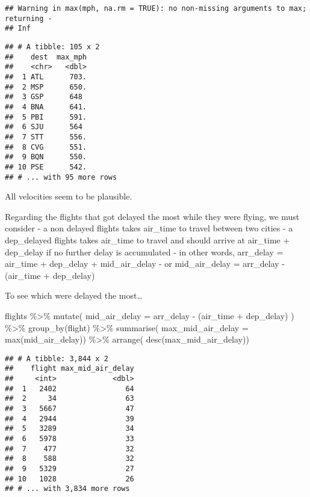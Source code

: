 \documentclass[
]{article}
\newenvironment{Shaded}{\begin{snugshade}}{\end{snugshade}}
\newcommand{\AttributeTok}[1]{\textcolor[rgb]{0.77,0.63,0.00}{#1}}
\newcommand{\FunctionTok}[1]{\textcolor[rgb]{0.00,0.00,0.00}{#1}}
\newcommand{\NormalTok}[1]{#1}
\newcommand{\SpecialCharTok}[1]{\textcolor[rgb]{0.00,0.00,0.00}{#1}}
\begin{document}
\begin{verbatim}
## Warning in max(mph, na.rm = TRUE): no non-missing arguments to max; returning -
## Inf
\end{verbatim}

\begin{verbatim}
## # A tibble: 105 x 2
##    dest  max_mph
##    <chr>   <dbl>
##  1 ATL      703.
##  2 MSP      650.
##  3 GSP      648 
##  4 BNA      641.
##  5 PBI      591.
##  6 SJU      564 
##  7 STT      556.
##  8 CVG      551.
##  9 BQN      550.
## 10 PSE      542.
## # ... with 95 more rows
\end{verbatim}

All velocities seem to be plausible.

Regarding the flights that got delayed the most while they were flying,
we must consider - a non delayed flights takes air\_time to travel
between two cities - a dep\_delayed flights takes air\_time to travel
and should arrive at air\_time + dep\_delay if no further delay is
accumulated - in other words, arr\_delay = air\_time + dep\_delay +
mid\_air\_delay - or mid\_air\_delay = arr\_delay - (air\_time +
dep\_delay)

To see which were delayed the most\ldots{}

\begin{Shaded}
\begin{Highlighting}[]
\NormalTok{flights }\SpecialCharTok{\%\textgreater{}\%} 
  \FunctionTok{mutate}\NormalTok{( }\AttributeTok{mid\_air\_delay =}\NormalTok{ arr\_delay }\SpecialCharTok{{-}}\NormalTok{ (air\_time }\SpecialCharTok{+}\NormalTok{ dep\_delay) ) }\SpecialCharTok{\%\textgreater{}\%} 
  \FunctionTok{group\_by}\NormalTok{(flight) }\SpecialCharTok{\%\textgreater{}\%} 
  \FunctionTok{summarise}\NormalTok{( }\AttributeTok{max\_mid\_air\_delay =} \FunctionTok{max}\NormalTok{(mid\_air\_delay)) }\SpecialCharTok{\%\textgreater{}\%} 
  \FunctionTok{arrange}\NormalTok{( }\FunctionTok{desc}\NormalTok{(max\_mid\_air\_delay))}
\end{Highlighting}
\end{Shaded}

\begin{verbatim}
## # A tibble: 3,844 x 2
##    flight max_mid_air_delay
##     <int>             <dbl>
##  1   2402                64
##  2     34                63
##  3   5667                47
##  4   2944                39
##  5   3289                34
##  6   5978                33
##  7    477                32
##  8    588                32
##  9   5329                27
## 10   1028                26
## # ... with 3,834 more rows
\end{verbatim}
\end{document}
